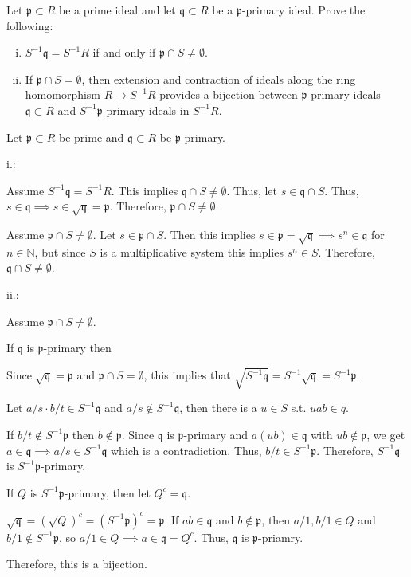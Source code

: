 \documentclass[12pt, letterpaper]{article}
\newcommand{\N}{\mathbb{N}}
\newcommand{\p}{\mathfrak{p}}
\newcommand{\mf}[1]{\mathfrak{#1}}
\begin{document}
\begin{subproblem}{}
    Let $\p \subset R$ be a prime ideal and let $\mf{q} \subset R$ be a $\p$-primary ideal. Prove the following:
    \begin{enumerate}[i.]
        \item $S^{-1} \mf{q} = S^{-1}R$ if and only if $\p \cap S \neq \emptyset$.
        \item If $\p \cap S = \emptyset$, then extension and contraction of ideals along the ring homomorphism $R \to S^{-1}R$
              provides a bijection between $\p$-primary ideals $\mf{q} \subset R$ and $S^{-1}\p$-primary ideals in $S^{-1}R$.
    \end{enumerate}
\end{subproblem}
\begin{problemproof}
    Let $\p \subset R$ be prime and $\mf{q} \subset R$ be $\p$-primary.

    i.:

    Assume $S^{-1}\mf{q} = S^{-1}R$. This implies $\mf{q} \cap S \neq \emptyset$. Thus, let $s \in \mf{q} \cap S$. Thus, $s \in \mf{q} \implies s \in \sqrt{\mf{q}}=\p$. Therefore, $\p \cap S \neq \emptyset$.

    Assume $\p \cap S \neq \emptyset$. Let  $s \in \p \cap S$. Then this implies $s \in \p = \sqrt{\mf{q}} \implies s^n \in \mf{q}$ for $n \in \N$, but since $S$ is a multiplicative system this implies $s^n \in S$. Therefore,
    $\mf{q} \cap S \neq \emptyset$.
    
    ii.:

    Assume $\p \cap S \neq \emptyset$.

    If $\mf{q}$ is $\p$-primary then

    Since $\sqrt{\mf{q}} = \p$ and $\p \cap S = \emptyset$, this implies that $\sqrt{S^{-1}\mf{q}}=S^{-1}\sqrt{\mf{q}}=S^{-1}\p$.

    Let $a/s \cdot b/t \in S^{-1}\mf{q}$ and $a/s \notin S^{-1}\mf{q}$, then there is a $u \in S$ s.t. $uab \in q$.

    If $b/t \notin S^{-1}\p$ then  $b \notin \p$. Since $\mf{q}$ is $\p$-primary and $a(ub) \in \mf{q}$ with $ub \notin \p$, we get $a \in \mf{q} \implies a/s \in S^{-1}\mf{q}$ which is a contradiction. Thus, $b/t \in S^{-1}\p$.
    Therefore, $S^{-1}\mf{q}$ is $S^{-1}\p$-primary.

    If $Q$ is $S^{-1}\p$-primary, then let $Q^c = \mf{q}$.

    $\sqrt{\mf{q}}=(\sqrt{Q})^c = (S^{-1}\p)^c = \p$. If $ab \in \mf{q}$ and $b \notin \p$, then $a/1,b/1 \in Q$ and $b/1 \notin S^{-1}\p$, so $a/1 \in Q \implies a \in \mf{q} = Q^c$. Thus, $\mf{q}$ is $\p$-priamry.

    Therefore, this is a bijection.
\end{problemproof}
\end{document}
